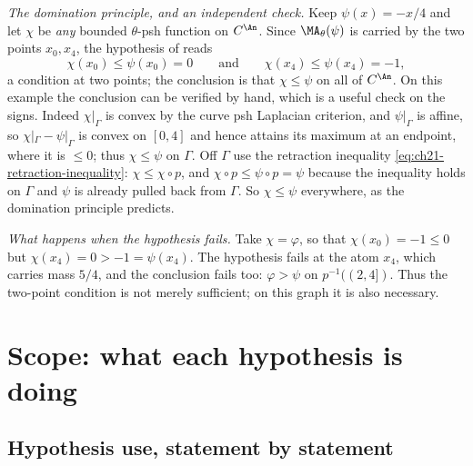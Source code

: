 \begin{example}
\emph{The domination principle, and an independent check.}  Keep
$\psi(x)=-x/4$ and let $\chi$ be \emph{any} bounded $\theta$-psh
function on $C^{\An}$.  Since $\MA_\theta(\psi)$ is carried by the two
points $x_0,x_4$, the hypothesis of
 reads
\[
 \chi(x_0)\leq\psi(x_0)=0
 \qquad\text{and}\qquad
 \chi(x_4)\leq\psi(x_4)=-1 ,
\]
a condition at two points; the conclusion is that $\chi\leq\psi$ on all of
$C^{\An}$.  On this example the conclusion can be verified by hand, which
is a useful check on the signs.  Indeed $\chi|_\Gamma$ is convex by the curve psh Laplacian criterion, and $\psi|_\Gamma$ is affine, so
$\chi|_\Gamma-\psi|_\Gamma$ is convex on $[0,4]$ and hence attains its
maximum at an endpoint, where it is $\leq0$; thus $\chi\leq\psi$ on
$\Gamma$.  Off $\Gamma$ use the retraction inequality
\eqref{eq:ch21-retraction-inequality}: $\chi\leq\chi\circ p$, and
$\chi\circ p\leq\psi\circ p=\psi$ because the inequality holds on
$\Gamma$ and $\psi$ is already pulled back from $\Gamma$.  So
$\chi\leq\psi$ everywhere, as the domination principle predicts.

\emph{What happens when the hypothesis fails.}  Take $\chi=\varphi$, so
that $\chi(x_0)=-1\leq0$ but $\chi(x_4)=0>-1=\psi(x_4)$.  The
hypothesis fails at the atom $x_4$, which carries mass $5/4$, and the
conclusion fails too: $\varphi>\psi$ on $p^{-1}((2,4])$.  Thus the
two-point condition is not merely sufficient; on this graph it is also
necessary.
\end{example}

\section{Scope: what each hypothesis is doing}
\label{sec:ch25-scope}

\subsection{Hypothesis use, statement by statement}
\label{sec:ch25-hypothesis-use}

